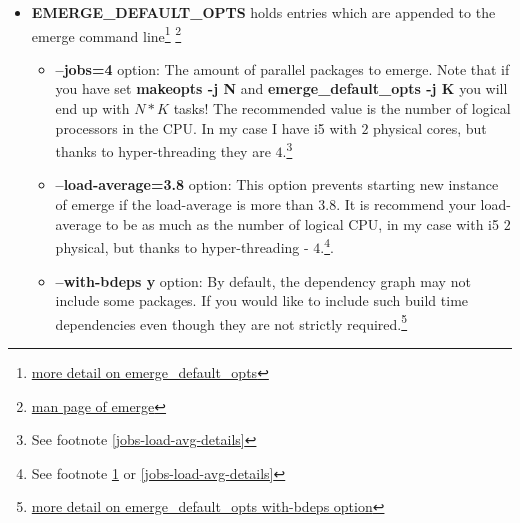 \documentclass[10pt,a4paper]{article}
\begin{document}
\begin{enumerate}
\begin{enumerate}[label*=\arabic*.]
\begin{itemize}
\begin{itemize}[label={o}]
					\item \textbf{--load-average=3.8} option: This option prevents starting new installations if the load-average is more than $ 3.8 $. It is recommend your load-average to be as much as the number of logical CPU, in my case with i5 $ 2 $ physical, but thanks to hyper-threading - $ 4 $.\footnote{\label{load-avg-explained-note} \href{http://blog.scoutapp.com/articles/2009/07/31/understanding-load-averages}{more detail on load average} or see footnote \ref{jobs-load-avg-details} }

				\end{itemize}
				
				\item \textbf{EMERGE\_DEFAULT\_OPTS} holds entries which are appended to the emerge command line\footnote{ \href{https://wiki.gentoo.org/wiki/EMERGE_DEFAULT_OPTS}{more detail on emerge\_default\_opts}} \footnote{ \href{https://dev.gentoo.org/~zmedico/portage/doc/man/emerge.1.html}{man page of emerge}}

				
				
				\begin{itemize}[label={o}]
					
					\item \textbf{--jobs=4} option: The amount of parallel packages to emerge. Note that if you have set \textbf{makeopts -j N} and \textbf{emerge\_default\_opts -j K} you will end up with $ N*K $ tasks! The recommended value is the number of logical processors in the CPU. In my case I have i5 with $ 2 $ physical cores, but thanks to hyper-threading they are $ 4 $.\footnote{ See footnote \ref{jobs-load-avg-details} }
					
					\item \textbf{--load-average=3.8} option: This option prevents starting new instance of emerge if the load-average is more than $ 3.8 $. It is recommend your load-average to be as much as the number of logical CPU, in my case with i5 $ 2 $ physical, but thanks to hyper-threading - $ 4 $.\footnote{See footnote \ref{load-avg-explained-note} or \ref{jobs-load-avg-details}}.
					
					\item \textbf{--with-bdeps y} option: By default, the dependency graph may not include some packages. If you would like to include such build time dependencies even though they are not strictly required.\footnote{ \href{https://wiki.gentoo.org/wiki/Project:Portage/FAQ\#Why_is_it_that_emerge_does_not_update_all_packages.3F}{more detail on emerge\_default\_opts with-bdeps option}}
					

\end{itemize}
\end{itemize}
\end{enumerate}
\end{enumerate}
\end{document}
